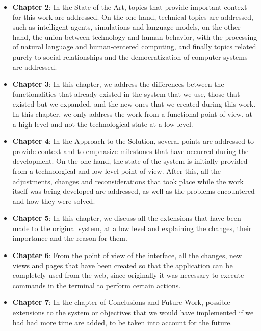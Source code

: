 \begin{itemize}
	
	\item \textbf{Chapter 2}: In the State of the Art, topics that provide important context for this work are addressed. On the one hand, technical topics are addressed, such as intelligent agents, simulations and language models, on the other hand, the union between technology and human behavior, with the processing of natural language and human-centered computing, and finally topics related purely to social relationships and the democratization of computer systems are addressed.
	
	\item \textbf{Chapter 3}: In this chapter, we address the differences between the functionalities that already existed in the system that we use, those that existed but we expanded, and the new ones that we created during this work. In this chapter, we only address the work from a functional point of view, at a high level and not the technological state at a low level.
	
	\item \textbf{Chapter 4}: In the Approach to the Solution, several points are addressed to provide context and to emphasize milestones that have occurred during the development. On the one hand, the state of the system is initially provided from a technological and low-level point of view. After this, all the adjustments, changes and reconsiderations that took place while the work itself was being developed are addressed, as well as the problems encountered and how they were solved.
	
	\item \textbf{Chapter 5}: In this chapter, we discuss all the extensions that have been made to the original system, at a low level and explaining the changes, their importance and the reason for them.
	
	\item \textbf{Chapter 6}: From the point of view of the interface, all the changes, new views and pages that have been created so that the application can be completely used from the web, since originally it was necessary to execute commands in the terminal to perform certain actions.
	
	\item \textbf{Chapter 7}: In the chapter of Conclusions and Future Work, possible extensions to the system or objectives that we would have implemented if we had had more time are added, to be taken into account for the future.
	
\end{itemize}



